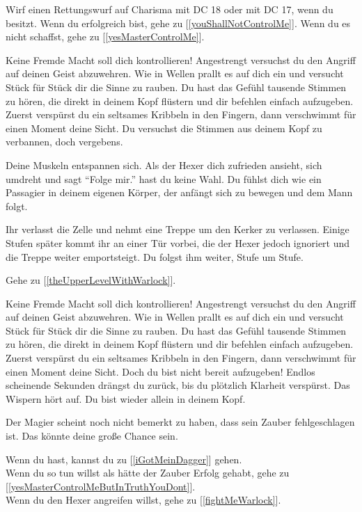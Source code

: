 Wirf einen Rettungswurf auf Charisma mit DC 18 oder mit DC 17, wenn du  besitzt. Wenn du erfolgreich bist, gehe zu [\ref{youShallNotControlMe}]. Wenn du es nicht schaffst, gehe zu [\ref{yesMasterControlMe}].


Keine Fremde Macht soll dich kontrollieren! Angestrengt versuchst du den Angriff auf deinen Geist abzuwehren. Wie in Wellen prallt es auf dich ein und versucht Stück für Stück dir die Sinne zu rauben. Du hast das Gefühl tausende Stimmen zu hören, die direkt in deinem Kopf flüstern und dir befehlen einfach aufzugeben. Zuerst verspürst du ein seltsames Kribbeln in den Fingern, dann verschwimmt für einen Moment deine Sicht. Du versuchst die Stimmen aus deinem Kopf zu verbannen, doch vergebens.

Deine Muskeln entspannen sich. Als der Hexer dich zufrieden ansieht, sich umdreht und sagt ``Folge mir.'' hast du keine Wahl. Du fühlst dich wie ein Passagier in deinem eigenen Körper, der anfängt sich zu bewegen und dem Mann folgt.

Ihr verlasst die Zelle und nehmt eine Treppe um den Kerker zu verlassen. Einige Stufen später kommt ihr an einer Tür vorbei, die der Hexer jedoch ignoriert und die Treppe weiter emportsteigt. Du folgst ihm weiter, Stufe um Stufe.

Gehe zu [\ref{theUpperLevelWithWarlock}].


Keine Fremde Macht soll dich kontrollieren! Angestrengt versuchst du den Angriff auf deinen Geist abzuwehren. Wie in Wellen prallt es auf dich ein und versucht Stück für Stück dir die Sinne zu rauben. Du hast das Gefühl tausende Stimmen zu hören, die direkt in deinem Kopf flüstern und dir befehlen einfach aufzugeben. Zuerst verspürst du ein seltsames Kribbeln in den Fingern, dann verschwimmt für einen Moment deine Sicht. Doch du bist nicht bereit aufzugeben! Endlos scheinende Sekunden drängst du zurück, bis du plötzlich Klarheit verspürst. Das Wispern hört auf. Du bist wieder allein in deinem Kopf.

Der Magier scheint noch nicht bemerkt zu haben, dass sein Zauber fehlgeschlagen ist. Das könnte deine große Chance sein.

Wenn du  hast, kannst du zu [\ref{iGotMeinDagger}] gehen.
\\Wenn du so tun willst als hätte der Zauber Erfolg gehabt, gehe zu [\ref{yesMasterControlMeButInTruthYouDont}].
\\Wenn du den Hexer angreifen willst, gehe zu [\ref{fightMeWarlock}].

